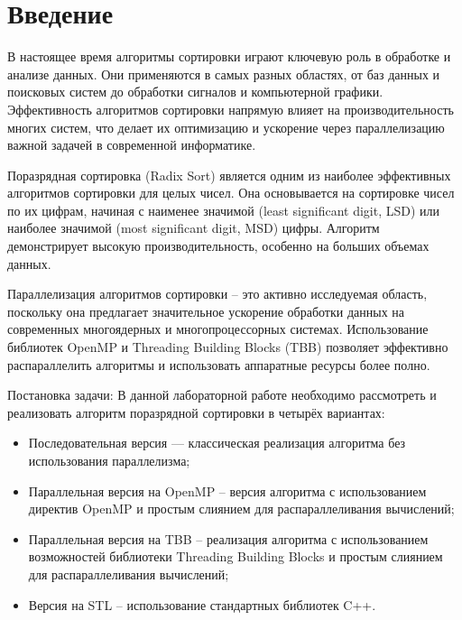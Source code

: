 \documentclass[]{article}
\theoremstyle{remark}
\theoremstyle{definition}
\begin{document}
\setcounter{page}{2}

\tableofcontents
\newpage

\section{Введение}

\par В настоящее время алгоритмы сортировки играют ключевую роль в обработке и анализе данных. Они применяются в самых разных областях, от баз данных и поисковых систем до обработки сигналов и компьютерной графики. Эффективность алгоритмов сортировки напрямую влияет на производительность многих систем, что делает их оптимизацию и ускорение через параллелизацию важной задачей в современной информатике.

\par Поразрядная сортировка (Radix Sort) является одним из наиболее эффективных алгоритмов сортировки для целых чисел. Она основывается на сортировке чисел по их цифрам, начиная с наименее значимой (least significant digit, LSD) или наиболее значимой (most significant digit, MSD) цифры. Алгоритм демонстрирует высокую производительность, особенно на больших объемах данных.

\par Параллелизация алгоритмов сортировки – это активно исследуемая область, поскольку она предлагает значительное ускорение обработки данных на современных многоядерных и многопроцессорных системах. Использование библиотек OpenMP и Threading Building Blocks (TBB) позволяет эффективно распараллелить алгоритмы и использовать аппаратные ресурсы более полно.

\par Постановка задачи: В данной лабораторной работе необходимо рассмотреть и реализовать алгоритм поразрядной сортировки в четырёх вариантах:

\begin{itemize}
    \item Последовательная версия — классическая реализация алгоритма без использования параллелизма;
    \item Параллельная версия на OpenMP -- версия алгоритма с использованием директив OpenMP и простым слиянием для распараллеливания вычислений;
    \item Параллельная версия на TBB -- реализация алгоритма с использованием возможностей библиотеки Threading Building Blocks и простым слиянием для распараллеливания вычислений;
    \item Версия на STL -- использование стандартных библиотек C++.
\end{itemize}
\end{document}
